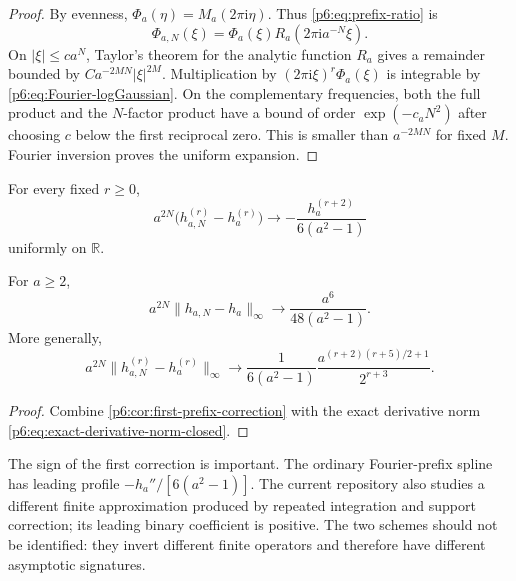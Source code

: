 \documentclass[11pt,oneside]{article}
\numberwithin{equation}{section}
\theoremstyle{definition}
\theoremstyle{remark}
\newcommand{\R}{\mathbb R}
\newcommand{\ii}{\mathrm i}
\begin{document}
\begin{proof}
By evenness,
$\Phi_a(\eta)=M_a(2\pi\ii\eta)$.  Thus
\eqref{p6:eq:prefix-ratio} is
\[
 \Phi_{a,N}(\xi)=
 \Phi_a(\xi)R_a(2\pi\ii a^{-N}\xi).
\]
On $|\xi|\le c a^N$, Taylor's theorem for the analytic function $R_a$ gives a
remainder bounded by
$C a^{-2MN}|\xi|^{2M}$.  Multiplication by
$(2\pi\ii\xi)^r\Phi_a(\xi)$ is integrable by
\eqref{p6:eq:Fourier-logGaussian}.  On the complementary frequencies, both the
full product and the $N$-factor product have a bound of order
$\exp(-c_aN^2)$ after choosing $c$ below the first reciprocal zero.  This is
smaller than $a^{-2MN}$ for fixed $M$.  Fourier inversion proves the uniform
expansion.
\end{proof}

\begin{corollary}\label{p6:cor:first-prefix-correction}
For every fixed $r\ge0$,
\begin{equation}\label{p6:eq:first-prefix-correction}
 a^{2N}\bigl(h_{a,N}^{(r)}-h_a^{(r)}\bigr)
 \longrightarrow
 -\frac{h_a^{(r+2)}}{6(a^2-1)}
\end{equation}
uniformly on $\R$.
\end{corollary}

\begin{corollary}\label{p6:cor:prefix-norm}
For $a\ge2$,
\begin{equation}\label{p6:eq:prefix-norm-leading}
 a^{2N}\|h_{a,N}-h_a\|_\infty
 \longrightarrow
 \frac{a^6}{48(a^2-1)}.
\end{equation}
More generally,
\begin{equation}\label{p6:eq:prefix-derivative-norm-leading}
 a^{2N}\|h_{a,N}^{(r)}-h_a^{(r)}\|_\infty
 \longrightarrow
 \frac{1}{6(a^2-1)}
 \frac{a^{(r+2)(r+5)/2+1}}{2^{r+3}}.
\end{equation}
\end{corollary}

\begin{proof}
Combine \cref{p6:cor:first-prefix-correction} with the exact derivative norm
\eqref{p6:eq:exact-derivative-norm-closed}.
\end{proof}

\begin{novelbox}
The sign of the first correction is important.  The ordinary Fourier-prefix
spline has leading profile $-h_a''/[6(a^2-1)]$.  The current repository also
studies a different finite approximation produced by repeated integration and
support correction; its leading binary coefficient is positive.  The two
schemes should not be identified: they invert different finite operators and
therefore have different asymptotic signatures.
\end{novelbox}
\end{document}

